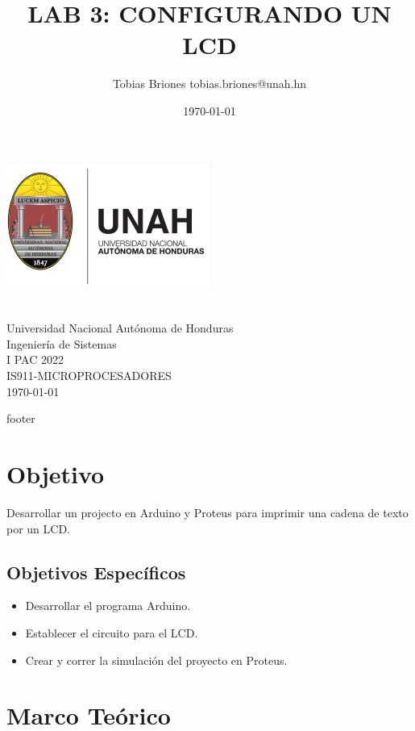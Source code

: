 \documentclass{article}
\title{LAB 3: CONFIGURANDO UN LCD}
\author{Tobias Briones \bigbreak tobias.briones@unah.hn}
\date{\today}
\begin{document}
    \makeatletter
    \begin{titlepage}
        \begin{center}
            \includegraphics[width=0.3\linewidth]{images/logo-unah}\\[4ex]
            {\huge \bfseries \@title
            \vspace{1cm}}\\[2ex]
            {\LARGE \@author}\\[50ex]

            {\large
            Universidad Nacional Autónoma de Honduras\\
            Ingeniería de Sistemas\\
            I PAC 2022\\
            IS911-MICROPROCESADORES
            }\\[2ex]

            {\large \today}
        \end{center}
    \end{titlepage}
    \makeatother
    \thispagestyle{empty}
    \newpage

    {footer}

    \section{Objetivo}

    Desarrollar un projecto en Arduino y Proteus para imprimir una cadena de
    texto por un LCD.

    \subsection{Objetivos Específicos}

    \begin{itemize}
        \item Desarrollar el programa Arduino.
        \item Establecer el circuito para el LCD.
        \item Crear y correr la simulación del proyecto en Proteus.
    \end{itemize}

    \section{Marco Teórico}
\end{document}
